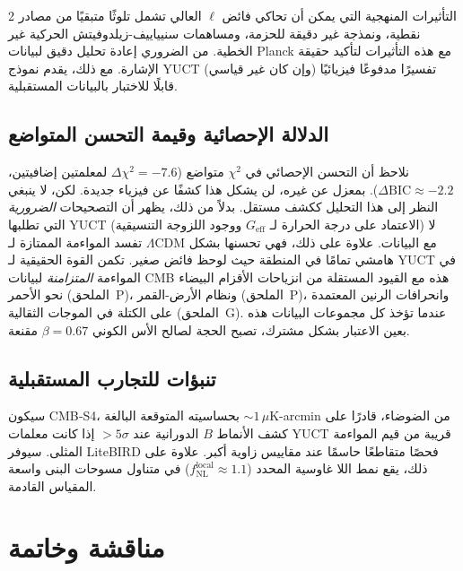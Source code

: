 \documentclass[11pt,a4paper]{article}
\begin{document}
\begin{multicols}{2}
		التأثيرات المنهجية التي يمكن أن تحاكي فائض $\ell$ العالي تشمل تلوثًا متبقيًا من مصادر نقطية، ونمذجة غير دقيقة للحزمة، ومساهمات سنيياييف-زيلدوفيتش الحركية غير الخطية. من الضروري إعادة تحليل دقيق لبيانات Planck مع هذه التأثيرات لتأكيد حقيقة الإشارة. مع ذلك، يقدم نموذج YUCT تفسيرًا مدفوعًا فيزيائيًا (وإن كان غير قياسي) قابلًا للاختبار بالبيانات المستقبلية.
		
		\subsection{الدلالة الإحصائية وقيمة التحسن المتواضع}
		
		نلاحظ أن التحسن الإحصائي في $\chi^2$ متواضع ($\Delta\chi^2 = -7.6$ لمعلمتين إضافيتين، $\Delta\mathrm{BIC} \approx -2.2$). بمعزل عن غيره، لن يشكل هذا كشفًا عن فيزياء جديدة. لكن، لا ينبغي النظر إلى هذا التحليل ككشف مستقل. بدلاً من ذلك، يظهر أن التصحيحات \textit{الضرورية} التي تطلبها YUCT (الاعتماد على درجة الحرارة لـ $G_{\mathrm{eff}}$ ووجود اللزوجة التنسيقية) لا تفسد المواءمة الممتازة لـ $\Lambda$CDM مع البيانات. علاوة على ذلك، فهي تحسنها بشكل هامشي تمامًا في المنطقة حيث لوحظ فائض صغير. تكمن القوة الحقيقية لـ YUCT في المواءمة \textit{المتزامنة} لبيانات CMB هذه مع القيود المستقلة من انزياحات الأقزام البيضاء نحو الأحمر (الملحق~P)، ونظام الأرض-القمر (الملحق~P)، وانحرافات الرنين المعتمدة على الكتلة في الموجات الثقالية (الملحق~G). عندما تؤخذ كل مجموعات البيانات هذه بعين الاعتبار بشكل مشترك، تصبح الحجة لصالح الأس الكوني $\beta=0.67$ مقنعة.
		
		\subsection{تنبؤات للتجارب المستقبلية}
		
		سيكون CMB‑S4، بحساسيته المتوقعة البالغة $\sim 1\,\mu$K-arcmin من الضوضاء، قادرًا على كشف الأنماط $B$ الدورانية عند $>5\sigma$ إذا كانت معلمات YUCT قريبة من قيم المواءمة المثلى. سيوفر LiteBIRD فحصًا متقاطعًا حاسمًا عند مقاييس زاوية أكبر. علاوة على ذلك، يقع نمط اللا غاوسية المحدد ($f_{\mathrm{NL}}^{\mathrm{local}} \approx 1.1$) في متناول مسوحات البنى واسعة المقياس القادمة.
		
		\section{مناقشة وخاتمة}
		

\end{multicols}
\end{document}
